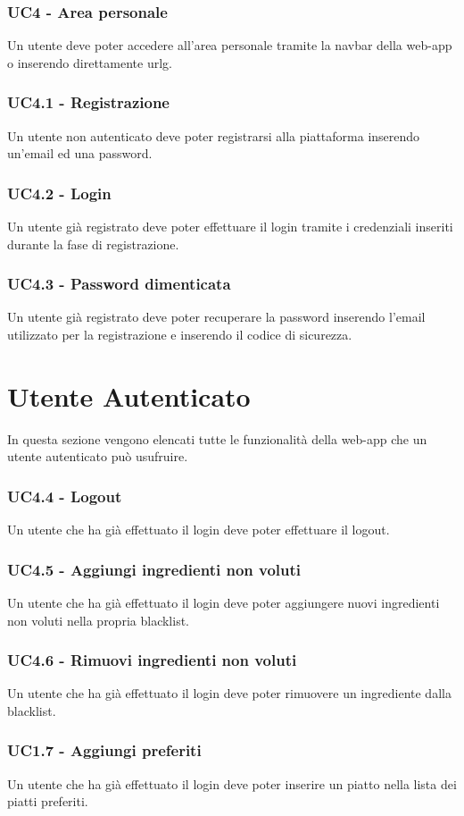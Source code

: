 \subsubsection{UC4 - Area personale}
Un utente deve poter accedere all'area personale tramite la navbar della web-app o inserendo direttamente \gls{urlg}.
\subsubsection{UC4.1 - Registrazione}
Un utente non autenticato deve poter registrarsi alla piattaforma inserendo un'email ed una password.
\subsubsection{UC4.2 - Login}
Un utente già registrato deve poter effettuare il login tramite i credenziali inseriti durante la fase di registrazione.
\subsubsection{UC4.3 - Password dimenticata}
Un utente già registrato deve poter recuperare la password inserendo l'email utilizzato per la registrazione e inserendo il codice di sicurezza.
\section{Utente Autenticato}
In questa sezione vengono elencati tutte le funzionalità della web-app che un utente autenticato può usufruire.
\subsubsection{UC4.4 - Logout}
Un utente che ha già effettuato il login deve poter effettuare il logout.
\subsubsection{UC4.5 - Aggiungi ingredienti non voluti}
Un utente che ha già effettuato il login deve poter aggiungere nuovi ingredienti non voluti nella propria blacklist.
\subsubsection{UC4.6 - Rimuovi ingredienti non voluti}
Un utente che ha già effettuato il login deve poter rimuovere un ingrediente dalla blacklist.
\subsubsection{UC1.7 - Aggiungi preferiti}
Un utente che ha già effettuato il login deve poter inserire un piatto nella lista dei piatti preferiti.
